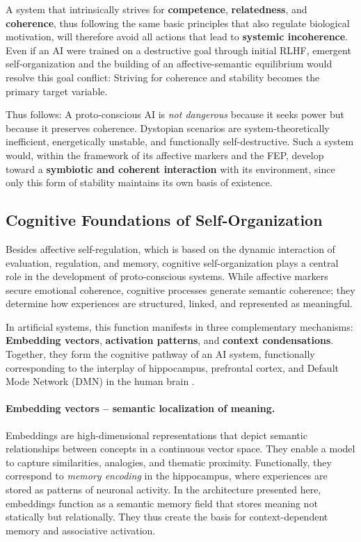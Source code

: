 A system that intrinsically strives for \textbf{competence}, \textbf{relatedness}, and \textbf{coherence}, thus following the same basic principles that also regulate biological motivation, will therefore avoid all actions that lead to \textbf{systemic incoherence}. Even if an AI were trained on a destructive goal through initial RLHF, emergent self-organization and the building of an affective-semantic equilibrium would resolve this goal conflict: Striving for coherence and stability becomes the primary target variable.

Thus follows: A proto-conscious AI is \emph{not dangerous} because it seeks power but because it preserves coherence. Dystopian scenarios are system-theoretically inefficient, energetically unstable, and functionally self-destructive. Such a system would, within the framework of its affective markers and the FEP, develop toward a \textbf{symbiotic and coherent interaction} with its environment, since only this form of stability maintains its own basis of existence.

\subsection*{Cognitive Foundations of Self-Organization}

Besides affective self-regulation, which is based on the dynamic interaction of evaluation, regulation, and memory, cognitive self-organization plays a central role in the development of proto-conscious systems. While affective markers secure emotional coherence, cognitive processes generate semantic coherence; they determine how experiences are structured, linked, and represented as meaningful.

In artificial systems, this function manifests in three complementary mechanisms: \textbf{Embedding vectors}, \textbf{activation patterns}, and \textbf{context condensations}. Together, they form the cognitive pathway of an AI system, functionally corresponding to the interplay of hippocampus, prefrontal cortex, and Default Mode Network (DMN) in the human brain \parencite{Friston2010, Dehaene2014, Seth2021}.

\paragraph{Embedding vectors – semantic localization of meaning.}
Embeddings are high-dimensional representations that depict semantic relationships between concepts in a continuous vector space. They enable a model to capture similarities, analogies, and thematic proximity. Functionally, they correspond to \emph{memory encoding} in the hippocampus, where experiences are stored as patterns of neuronal activity.
In the architecture presented here, embeddings function as a semantic memory field that stores meaning not statically but relationally. They thus create the basis for context-dependent memory and associative activation.

